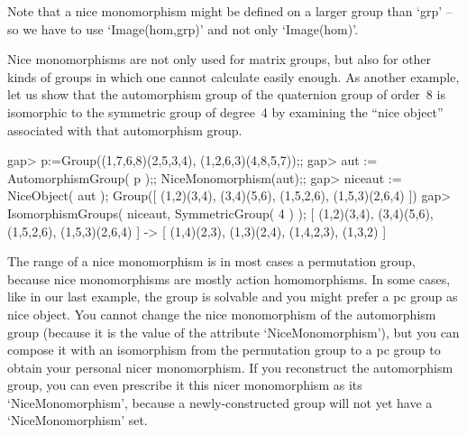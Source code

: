 Note that a nice monomorphism might be defined on a larger group than `grp'
-- so we have to use `Image(hom,grp)' and not only `Image(hom)'.

%

Nice monomorphisms are not only used for matrix groups, but also for
other kinds of groups in which one cannot calculate easily enough. As
another example, let us show that the automorphism group of the
quaternion group of order~8 is isomorphic to the symmetric group of
degree~4  by examining the ``nice object'' associated with that
automorphism group.

\beginexample
gap> p:=Group((1,7,6,8)(2,5,3,4), (1,2,6,3)(4,8,5,7));;
gap> aut := AutomorphismGroup( p );; NiceMonomorphism(aut);;
gap> niceaut := NiceObject( aut );
Group([ (1,2)(3,4), (3,4)(5,6), (1,5,2,6), (1,5,3)(2,6,4) ])
gap> IsomorphismGroups( niceaut, SymmetricGroup( 4 ) );
[ (1,2)(3,4), (3,4)(5,6), (1,5,2,6), (1,5,3)(2,6,4) ] -> 
[ (1,4)(2,3), (1,3)(2,4), (1,4,2,3), (1,3,2) ]
\endexample

%

The range of  a nice monomorphism is  in most cases a permutation  group,
because  nice monomorphisms  are mostly action  homomorphisms. In some
cases,  like in  our last example,  the  group is solvable  and you might
prefer a pc group as nice object. You cannot change the nice monomorphism
of  the automorphism  group (because it  is   the value  of the attribute
`NiceMonomorphism'), but you can compose  it with an isomorphism from the
permutation  group to  a  pc   group  to   obtain your  personal    nicer
monomorphism. If  you reconstruct  the automorphism  group,  you can even
prescribe it this nicer monomorphism as its `NiceMonomorphism', because a
newly-constructed group will not yet have a `NiceMonomorphism' set.

